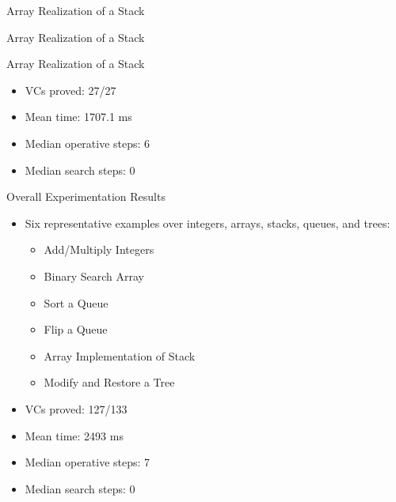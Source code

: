 \begin{frame}{Array Realization of a Stack}
	
\end{frame}


\begin{frame}{Array Realization of a Stack}
	
\end{frame}


\begin{frame}{Array Realization of a Stack}
	\begin{itemize}
		\item VCs proved: 27/27
		\item Mean time: 1707.1 ms
		\item Median operative steps: 6
		\item Median search steps: 0
	\end{itemize}
\end{frame}


\begin{frame}{Overall Experimentation Results}
	\begin{itemize}
		\item Six representative examples over integers, arrays, stacks, queues, and trees:\\
		\begin{itemize}
			\item Add/Multiply Integers
			\item Binary Search Array
			\item Sort a Queue
			\item Flip a Queue
			\item Array Implementation of Stack
			\item Modify and Restore a Tree
		\end{itemize}
		\item VCs proved: 127/133
		\item Mean time: 2493 ms
		\item Median operative steps: 7
		\item Median search steps: 0
	\end{itemize}
\end{frame}



